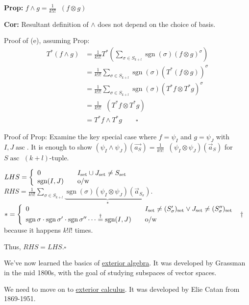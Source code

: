 \documentclass[10pt,letterpaper]{article}
\newcommand{\n}{\hfill\break}
\newcommand{\up}{\vspace{-\baselineskip}}
\newcommand{\prop}[1]{\par\noindent\settowidth{\hangindent}{\textbf{Prop: }}\textbf{Prop: }#1\n}
\newcommand{\cor}[1]{\par\noindent\settowidth{\hangindent}{\textbf{Cor: }}\textbf{Cor: }#1\n}
\newcommand{\proven}{\;$\square$\n}
\newcommand{\ptxt}[1]{\textrm{\textnormal{#1}}}
\DeclareMathOperator{\sgn}{sgn}
\newcommand{\ot}{\otimes}
\newcommand{\ox}{\otimes}
\DeclareMathOperator{\asc}{asc}
\DeclareMathOperator{\asSet}{set}
\DeclareMathOperator{\ringA}{\mathring{A}}
\newcommand{\paren}[1]{\left(#1\right)}
\begin{document}
\vspace{15pt}
\prop{$f\wedge{}g=\frac{1}{k!l!}\ringA(f\ot{}g)$}

\cor{Resultant definition of $\wedge$ does not depend on the choice of basis.}

\par\noindent Proof of (e), assuming Prop:\up
\begin{align*}
	T^{*}(f\wedge{}g) & =\frac{1}{k!l!}T^{*}\paren{\sum_{\sigma\in{}S_{k+l}}\sgn(\sigma)(f\ox{}g)^{\sigma}}\\
	& =\frac{1}{k!l!}\sum_{\sigma\in{}S_{k+l}}\sgn(\sigma)(T^{*}(f\ox{}g))^{\sigma}\\
	& =\frac{1}{k!l!}\sum_{\sigma\in{}S_{k+l}}\sgn(\sigma)(T^{*}f\ox{}T^{*}g)^{\sigma}\\
	& =\frac{1}{k!l!}\ringA(T^{*}f\ox{}T^{*}g)\\
	& =T^{*}f\wedge{}T^{*}g\qquad\square
\end{align*}

\par\noindent Proof of Prop: Examine the key special case where $f=\psi_{I}$ and $g=\psi_{J}$ with $I,J\asc$.\n
It is enough to show $(\psi_{I}\wedge\psi_{J})(\vec{a_{S}})=\frac{1}{k!l!}\ringA(\psi_{I}\ox\psi_{J})(\vec{a}_{S})$ for $S\asc$ $(k+l)$-tuple.\n

\par\noindent $LHS=\left\{\begin{array}{ll}0 & \quad{}I_{\asSet}\cup{}J_{\asSet}\ne{}S_{\asSet}\\ \sgn(I,J) & \quad\ptxt{o/w}\end{array}\right.$\n
$\displaystyle{}RHS=\frac{1}{k!l!}\sum_{\sigma\in{}S_{k+l}}\underbrace{\sgn(\sigma)(\psi_{I}\ox\psi_{J})(\vec{a}_{S_{\sigma}})}_{*}$.\n
$\displaystyle{}*=\left\{\begin{array}{ll}0 & \quad{}I_{\asSet}\ne(S_{\sigma}')_{\asSet}\lor{}J_{\asSet}\ne(S_{\sigma}'')_{\asSet}\\ \sgn\sigma\cdot\sgn\sigma'\cdot\sgn\sigma''\cdots\overset{\dagger}{=}\sgn(I,J) & \quad\ptxt{o/w}\end{array}\right.$\n
$\dagger$ because it happens $k!l!$ times.\n

\par\noindent Thus, $RHS=LHS$.\proven

\par\noindent We've now learned the basics of \underline{exterior algebra}. It was developed by Grassman in the mid 1800s, with the goal of studying subspaces of vector spaces.\n

\par\noindent We need to move on to \underline{exterior calculus}. It was developed by Elie Catan from 1869-1951.
\end{document}
